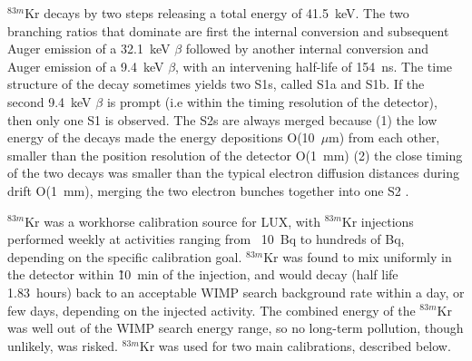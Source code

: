 $^{83m}$Kr decays by two steps releasing a total energy of 41.5~keV. The two branching ratios that dominate are first the internal conversion and subsequent Auger emission of a 32.1~keV $\beta$ followed by another internal conversion and Auger emission of a 9.4~keV $\beta$, with an intervening half-life of 154~ns. The time structure of the decay sometimes yields two S1s, called S1a and S1b. If the second 9.4~keV $\beta$ is prompt (i.e within the timing resolution of the detector), then only one S1 is observed. The S2s are always merged because (1) the low energy of the decays made the energy depositions O(10~$\mu$m) from each other, smaller than the position resolution of the detector O(1~mm) (2) the close timing of the two decays was smaller than the typical electron diffusion distances during drift O(1~mm), merging the two electron bunches together into one S2 \cite{LUXKr}.

$^{83m}$Kr was a workhorse calibration source for \ac{LUX}, with $^{83m}$Kr injections performed weekly at activities ranging from ~10~Bq to hundreds of Bq, depending on the specific calibration goal.  $^{83m}$Kr was found to mix uniformly in the detector within \~10~min of the injection, and would decay (half life 1.83~hours) back to an acceptable \ac{WIMP} search background rate within a day, or few days, depending on the injected activity. The combined energy of the $^{83m}$Kr was well out of the \ac{WIMP} search energy range, so no long-term pollution, though unlikely, was risked. $^{83m}$Kr was used for two main calibrations, described below.

